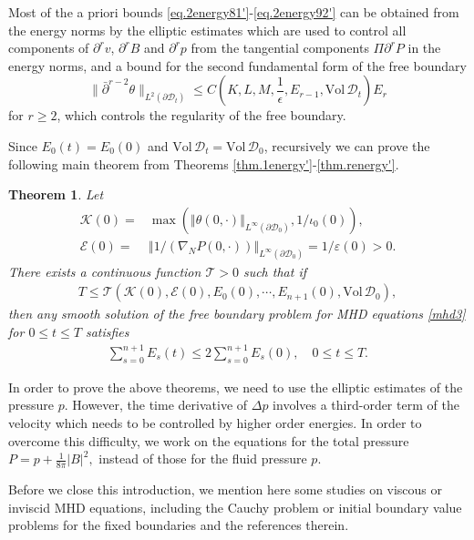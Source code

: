 \documentclass[12pt,reqno]{amsart}
\numberwithin{equation}{section}
\newtheorem{theorem}{Theorem}[section]
\theoremstyle{definition}
\theoremstyle{remark}
\begin{document}
Most of the a priori  bounds \eqref{eq.2energy81'}-\eqref{eq.2energy92'}  can be obtained from the energy norms by the elliptic estimates which are used to control all components of ${\partial}^r v$, ${\partial}^r B$ and ${\partial}^r p$ from the tangential components $\Pi {\partial}^r P$ in the energy norms, and
 a bound for the second fundamental form of the free boundary
$$\|\bar {\partial}^{r-2}\theta\|_{L^2({\partial}{{\mathscr{D}}}_t)}{\leqslant} C\left( K, L, M, \frac{1}{\epsilon}, E_{r-1}, {\mathrm{Vol}\,}{{\mathscr{D}}}_t\right)E_r$$
for $r\ge 2$, which controls the regularity of the free boundary.

Since $E_0(t)=E_0(0)$ and ${\mathrm{Vol}\,} {{\mathscr{D}}}_t={\mathrm{Vol}\,} {{\mathscr{D}}}_0$, recursively we can prove the following main theorem from Theorems \ref{thm.1energy'}-\ref{thm.renergy'}.

\begin{theorem}
Let \begin{align}
  {\mathcal{K}}(0)=&\max\left({\left\Vert{\theta(0,\cdot)}\right\Vert}_{L^\infty({\partial}{{\mathscr{D}}}_0)}, 1/\iota_0(0)\right),\label{eq.K'}\\
  {\mathcal{E}}(0)=&{\left\Vert{1/({\nabla}_N P(0,\cdot))}\right\Vert}_{L^\infty({\partial}{{\mathscr{D}}}_0)}=1/{\varepsilon}(0)>0. \label{eq.E'}
\end{align}
   There exists a continuous function ${\mathcal{T}}>0$ such that if
  \begin{align}
    T{\leqslant} {\mathcal{T}}({\mathcal{K}}(0),{\mathcal{E}}(0),E_0(0),\cdots, E_{n+1}(0),{\mathrm{Vol}\,} {{\mathscr{D}}}_0 ),
  \end{align}
 then any smooth solution of the free boundary problem for MHD equations \eqref{mhd3} for $0{\leqslant} t{\leqslant} T$ satisfies
  \begin{align}
    \sum_{s=0}^{n+1} E_s(t){\leqslant} 2\sum_{s=0}^{n+1} E_s(0), \quad 0{\leqslant} t{\leqslant} T.
  \end{align}
\end{theorem}

In order to prove the above theorems, we need to use the elliptic estimates of the pressure $p$. However, the time derivative of $\Delta p$  involves a third-order term of the velocity which needs to be controlled by higher order energies. In order to overcome this difficulty, we work on the equations for the total pressure
${P }=p+\frac{1}{8\pi}|{B}|^2,$ instead of those for the fluid pressure $p$.

Before we close this introduction, we mention here some studies on viscous or inviscid MHD equations, including the Cauchy problem or initial boundary value problems for the fixed boundaries \cite{DL02,DL72,LW11,HX05,HW08,HW10,PS10,ST83, Sec02, YM} and the references therein.
\end{document}
